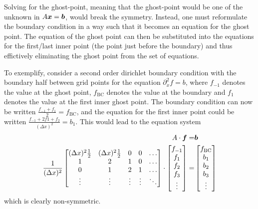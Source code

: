 Solving for the ghost-point, meaning that the ghost-point would be one of the
unknown in $A\boldsymbol{x}=\boldsymbol{b}$, would break the symmetry. Instead, one must
reformulate the boundary condition in a way such that it becomes an equation
for the ghost point. The equation of the ghost point can then be substituted
into the equations for the first/last inner point (the point just before the
boundary) and thus effictively eliminating the ghost point from the set of
equations.

To exemplify, consider a second order dirichlet boundary condition with the
boundary half between grid points for the equation $\partial_x^2 f = b$, where
$f_{-1}$ denotes the value at the ghost point, $f_{\text{BC}}$ denotes the
value at the boundary and $f_{1}$ denotes the value at the first inner ghost
point. The boundary condition can now be written
$\frac{f_{-1}+f_{1}}{2}=f_{\text{BC}}$, and the equation for the first inner
point could be written $\frac{f_{-1}+2f{1}+f_{2}}{(\Delta x)^2}=b_1$. This
would lead to the equation system
%
\begin{align*}
    A\cdot\boldsymbol{f}=&\boldsymbol{b}\\
    \frac{1}{(\Delta x)^2}
    \begin{bmatrix}
        (\Delta x)^2\frac{1}{2} & (\Delta x)^2\frac{1}{2} & 0 & 0 & \ldots\\
        1                       & 2                       & 1 & 0 & \ldots\\
        0                       & 1                       & 2 & 1 & \ldots\\
        \vdots                  & \vdots              &\vdots&\vdots&\ddots\\
    \end{bmatrix}
    \cdot
    \begin{bmatrix}
        f_{-1}\\
        f_{1}\\
        f_{2}\\
        f_{3}\\
        \vdots
    \end{bmatrix}
    =&
    \begin{bmatrix}
        f_{\text{BC}}\\
        b_{1}\\
        b_{2}\\
        b_{3}\\
        \vdots
    \end{bmatrix}
\end{align*}
%
which is clearly non-symmetric.

